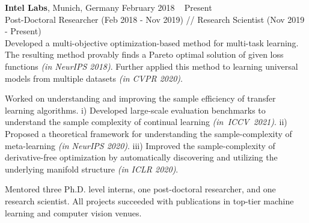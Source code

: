  \textbf{Intel Labs}, Munich, Germany \hfill February 2018 \textendash ~ Present \vspace{0.5mm}\\ \vspace{0mm}
   \hspace{-1.5mm} Post-Doctoral Researcher (Feb 2018 - Nov 2019) // Research Scientist (Nov 2019 - Present)  \hfill \vspace{-4mm} \\

Developed a multi-objective optimization-based method for multi-task learning. The resulting method provably finds a Pareto optimal solution of given loss functions \emph{(in NeurIPS 2018)}. Further applied this method to learning universal models from multiple datasets \emph{(in CVPR 2020)}.

Worked on understanding and improving the sample efficiency of transfer learning algorithms. i) Developed large-scale evaluation benchmarks to understand the sample complexity of continual learning \mbox{\emph{(in ICCV 2021)}}. ii) Proposed a theoretical framework for understanding the sample-complexity of meta-learning \emph{(in NeurIPS 2020)}. iii) Improved the sample-complexity of derivative-free optimization by automatically discovering and utilizing the underlying manifold structure \emph{(in ICLR 2020)}.

Mentored three Ph.D. level interns, one post-doctoral researcher, and one research scientist. All projects succeeded with publications in top-tier machine learning and computer vision venues.  